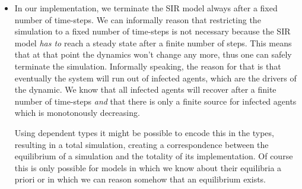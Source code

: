 \begin{itemize}
	\item In our implementation, we terminate the SIR model always after a fixed number of time-steps. We can informally reason that restricting the simulation to a fixed number of time-steps is not necessary because the SIR model \textit{has to} reach a steady state after a finite number of steps. This means that at that point the dynamics won't change any more, thus one can safely terminate the simulation. Informally speaking, the reason for that is that eventually the system will run out of infected agents, which are the drivers of the dynamic. We know that all infected agents will recover after a finite number of time-steps \textit{and} that there is only a finite source for infected agents which is monotonously decreasing. 
	
	Using dependent types it might be possible to encode this in the types, resulting in a total simulation, creating a correspondence between the equilibrium of a simulation and the totality of its implementation. Of course this is only possible for models in which we know about their equilibria a priori or in which we can reason somehow that an equilibrium exists.
\end{itemize}